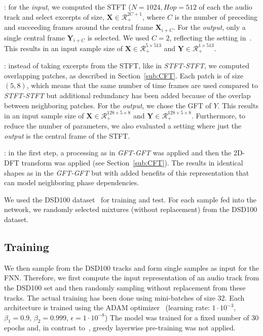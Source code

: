 \begin{description}[style=unboxed,leftmargin=0cm]
\item[STFT-STFT]: for the \emph{input}, we computed the STFT (\(N=1024, Hop=512\) of each the audio track and select excerpts of size, \(\mathbf{X} \in \mathcal{R}^{2C + 1}_{+} \), where \(C\) is the number of preceding and succeeding frames around the central frame \(\mathbf{X}_{i+C}\). For the \emph{output}, only a single central frame \(\mathbf{Y}_{i+C}\) is selected.
We used \(C=2\), reflecting the setting in~\cite{uhlich15}. This results in an input sample size of \(\mathbf{X} \in \mathcal{R}_{+}^{5 \times 513}\) and  \(\mathbf{Y} \in \mathcal{R}_{+}^{1 \times 513}\).

\item[GFT-GFT/GFT-STFT]: instead of taking excerpts from the STFT, like in \emph{STFT-STFT}, we computed overlapping patches, as described in Section~\ref{sub:CFT}. Each patch is of size \((5, 8)\), which means that the same number of time frames are used compared to \emph{STFT-STFT} but additional redundancy has been added because of the overlap between neighboring patches.
For the \emph{output}, we chose the GFT of \(Y\).
This results in an input sample size of \(\mathbf{X} \in \mathcal{R}_{+}^{128 \times 5 \times 8}\) and  \(\mathbf{Y} \in \mathcal{R}_{+}^{128 \times 5 \times 8}\).
Furthermore, to reduce the number of parameters, we also evaluated a setting where just the \emph{output} is the central frame of the STFT.

\item[CFT-CFT/CFT-STFT]: in the first step, a processing as in \emph{GFT-GFT} was applied and then the 2D-DFT transform was applied (see Section~\ref{sub:CFT}).
The results in identical shapes as in the \emph{GFT-GFT} but with added benefits of this representation that can model neighboring phase dependencies.
\end{description}

We used the DSD100 dataset~\cite{ono15} for training and test. 
For each sample fed into the network, we randomly selected mixtures (without replacement) from the DSD100 dataset.

\subsection{Training}
We then sample from the DSD100 tracks and form single samples as input for the FNN.
Therefore, we first compute the input representation of an audio track from the DSD100 set and then randomly sampling without replacement from these tracks.
The actual training has been done using mini-batches of size 32.
Each architecture is trained using the ADAM optimizer~\cite{kingma14} (learning rate: \(1 \cdot 10^{-3}\), \(\beta_1=0.9\), \(\beta_2=0.999\), \(\epsilon=1 \cdot 10^{-8}\))
The model was trained for a fixed number of 30 epochs and, in contrast to~\cite{uhlich15}, greedy layerwise pre-training was not applied.

